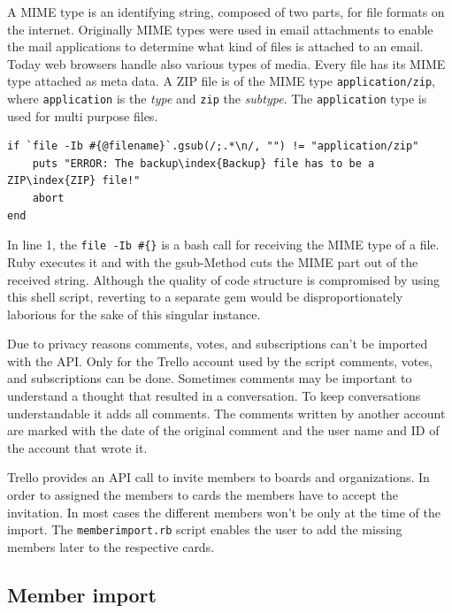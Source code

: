 A MIME type is an identifying string, composed of two parts, for file formats on the internet. Originally MIME types were used in email attachments to enable the  mail applications to determine what kind of files is attached to an email. Today web browsers handle also various types of media. Every file has its MIME type attached as meta data. A ZIP file is of the MIME type \texttt{application/zip}, where \texttt{application} is the \emph{type} and \texttt{zip} the \emph{subtype}. The \texttt{application} type is used for multi purpose files. \cite{rfc:2046}

\begin{lstlisting}[aboveskip=1\baselineskip, caption=Checking if the file has the MIME type \textquotedblleft application/zip\textquotedblright, label=listing008]
if `file -Ib #{@filename}`.gsub(/;.*\n/, "") != "application/zip"
	puts "ERROR: The backup\index{Backup} file has to be a ZIP\index{ZIP} file!"
	abort
end
\end{lstlisting}
	
In line 1, the \texttt{file -Ib \#\{\@filename\}} is a bash call for receiving the MIME type of a file. Ruby executes it and with the gsub-Method cuts the MIME part out of the received string. Although the quality of code structure is compromised by using this shell script, reverting to a separate gem would be disproportionately laborious for the sake of this singular instance. 

Due to privacy reasons comments, votes, and subscriptions can't be imported with the API. Only for the Trello account used by the script comments, votes, and subscriptions can be done. Sometimes comments may be important to understand a thought that resulted in a conversation. To keep conversations understandable it adds all comments. The comments written by another account are marked with the date of the original comment and the user name and ID of the account that wrote it. 

Trello provides an API call to invite members to boards and organizations. In order to assigned the members to cards the members have to accept the invitation. In most cases the different members won't be only at the time of the import. The \texttt{memberimport.rb} script enables the user to add the missing members later to the respective cards.

\subsection{Member import}

